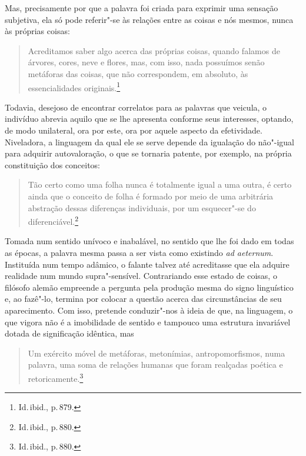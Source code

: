 Mas, precisamente por que a palavra foi criada para exprimir uma
sensação subjetiva, ela só pode referir"-se às relações entre as
coisas e nós mesmos, nunca às próprias coisas: 

\begin{quote}
Acreditamos saber algo
acerca das próprias coisas, quando falamos de árvores, cores, neve e
flores, mas, com isso, nada possuímos senão metáforas das coisas, que
não correspondem, em absoluto, às essencialidades originais.\footnote{
Id.\,ibid., p.\,879.}
\end{quote}

Todavia, desejoso de encontrar correlatos para as
palavras que veicula, o indivíduo abrevia aquilo que se lhe apresenta
conforme seus interesses, optando, de modo unilateral, ora por este,
ora por aquele aspecto da efetividade. Niveladora, a linguagem da qual
ele se serve depende da igualação do não"-igual para adquirir
autovaloração, o que se tornaria patente, por exemplo, na própria
constituição dos conceitos: 
\begin{quote}
Tão certo como uma folha
nunca é totalmente igual a uma outra, é certo ainda que o conceito de
folha é formado por meio de uma arbitrária abstração dessas diferenças
individuais, por um esquecer"-se 
do diferenciável.\footnote{ Id.\,ibid., p.\,880.}
\end{quote}

Tomada num sentido unívoco e inabalável, no sentido que lhe foi dado em
todas as épocas, a palavra mesma passa a ser vista como existindo
\textit{ad aeternum}. Instituída num tempo adâmico, o falante talvez
até acreditasse que ela adquire realidade num mundo
supra"-sensível. Contrariando esse estado de coisas, o filósofo alemão
empreende a pergunta pela produção mesma do signo linguístico e, ao
fazê"-lo, termina por colocar a questão acerca das circunstâncias de
seu aparecimento. Com isso, pretende conduzir"-nos à ideia de que, na
linguagem, o que vigora não é a imobilidade de sentido e tampouco uma
estrutura invariável dotada de significação idêntica, mas 

\begin{quote}
Um exército
móvel de metáforas, metonímias, antropomorfismos, numa palavra, uma
soma de relações humanas que foram realçadas poética e
retoricamente.\footnote{ Id.\,ibid., p.\,880.}
\end{quote}

